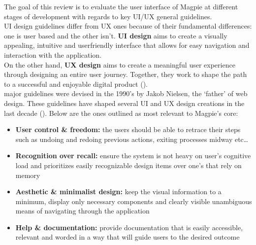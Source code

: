 The goal of this review is to evaluate the user interface of Magpie at different stages of development with regards to key UI/UX general guidelines.\\
UI design guidelines differ from UX ones because of their fundamental differences: one is user based and the other isn't. \textbf{UI design} aims to create a visually appealing, intuitive and user\-friendly interface that allows for easy navigation and interaction with the application.\\
On the other hand, \textbf{UX design} aims to create a meaningful user experience through designing an entire user journey. Together, they work to shape the path to a successful and enjoyable digital product (\cite{uiuxguidelines2023}).\\

 major guidelines were devised in the 1990's by Jakob Nielsen, the `father' of web design. These guidelines have shaped several UI and UX design creations in the last decade (\cite{uiuxguidelinesnielsen2016}). Below are the ones outlined as most relevant to Magpie's core:
\begin{itemize}
    \item \textbf{User control \& freedom:} the users should be able to retrace their steps such as undoing and redoing previous actions, exiting processes midway etc\ldots
    \item \textbf{Recognition over recall:} ensure the system is not heavy on user's cognitive load and prioritizes easily recognizable design items over one's that rely on memory
    \item \textbf{Aesthetic \& minimalist design:} keep the visual information to a minimum, display only necessary components and clearly visible unambiguous means of navigating through the application
    \item \textbf{Help \& documentation:} provide documentation that is easily accessible, relevant and worded in a way that will guide users to the desired outcome
\end{itemize}

